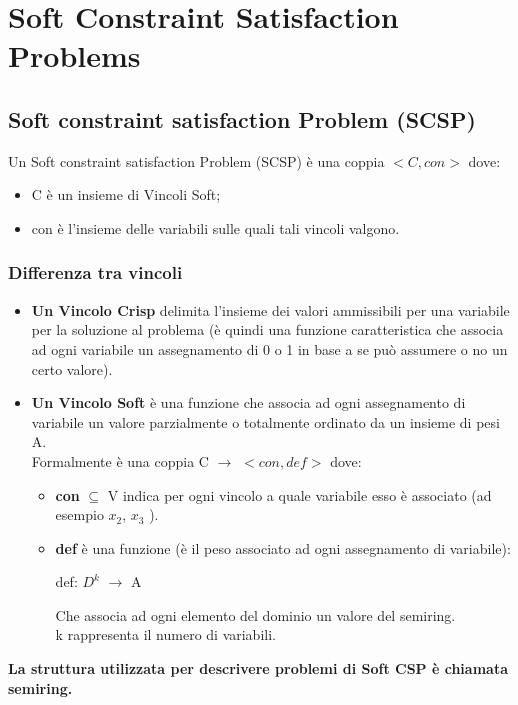 \chapter{Soft Constraint Satisfaction Problems} \label{ch:Soft Constraint Satisfaction Problems}
\section{Soft constraint satisfaction Problem (SCSP)}
Un Soft constraint satisfaction Problem (SCSP) è una coppia $<C, con>$ dove:
\begin{itemize}
    \item C è un insieme di Vincoli Soft;
    \item con è l’insieme delle variabili sulle quali tali vincoli valgono.
\end{itemize}
\newpage
\subsection{Differenza tra vincoli}
\begin{itemize}
    \item \textbf{Un Vincolo Crisp} delimita l’insieme dei valori ammissibili per una variabile per la soluzione al problema (è quindi una funzione caratteristica che associa ad ogni variabile un assegnamento di 0 o 1 in base a se può assumere o no un certo valore).
    
    \item \textbf{Un Vincolo Soft} è una funzione che associa ad ogni assegnamento di variabile un valore parzialmente o totalmente ordinato da un insieme di pesi A.
    \\Formalmente è una coppia C $\rightarrow$ $<con, def>$ dove:
    
    \begin{itemize}
        \item \textbf{con} $\subseteq$ V indica per ogni vincolo a quale variabile esso è associato (ad esempio $x_2 $, $x_3$ ).
        \item \textbf{def} è una funzione (è il peso associato ad ogni assegnamento di variabile):
        \begin{center}
            def: $D^k$ $\rightarrow$ A
            
            Che associa ad ogni elemento del dominio un valore del semiring. 
            \\k rappresenta il numero di variabili.
        \end{center}
    \end{itemize}
\end{itemize}
\textbf{La struttura utilizzata per descrivere problemi di Soft CSP è chiamata semiring.}
\newpage
